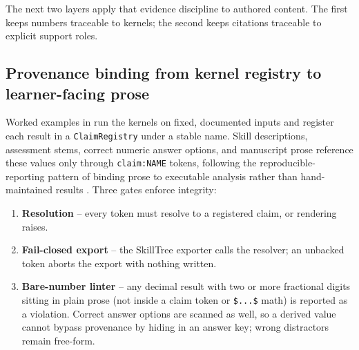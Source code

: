\documentclass[
  english,
]{article}
\providecommand{\tightlist}{%
  \setlength{\itemsep}{0pt}\setlength{\parskip}{0pt}}
\begin{document}
The next two layers apply that evidence discipline to authored content.
The first keeps numbers traceable to kernels; the second keeps citations
traceable to explicit support roles.

\subsection{Provenance binding from kernel registry to learner-facing
prose}\label{provenance-binding-from-kernel-registry-to-learner-facing-prose}

Worked examples in  run the kernels on
fixed, documented inputs and register each result in a
\texttt{ClaimRegistry} under a stable name. Skill descriptions,
assessment stems, correct numeric answer options, and manuscript prose
reference these values only through \texttt{claim:NAME} tokens,
following the reproducible-reporting pattern of binding prose to
executable analysis rather than hand-maintained results
\citep{xie2015knitr, sandve2013reproducible}. Three gates enforce
integrity:

\begin{enumerate}
\def\labelenumi{\arabic{enumi}.}
\tightlist
\item
  \textbf{Resolution} -- every token must resolve to a registered claim,
  or rendering raises.
\item
  \textbf{Fail-closed export} -- the SkillTree exporter calls the
  resolver; an unbacked token aborts the export with nothing written.
\item
  \textbf{Bare-number linter} -- any decimal result with two or more
  fractional digits sitting in plain prose (not inside a claim token or
  \texttt{\$...\$} math) is reported as a violation. Correct answer
  options are scanned as well, so a derived value cannot bypass
  provenance by hiding in an answer key; wrong distractors remain
  free-form.
\end{enumerate}
\end{document}

